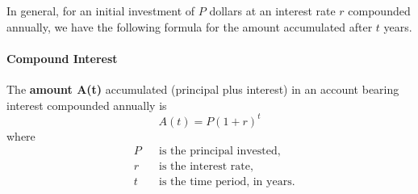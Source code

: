 \documentclass[10pt,]{book}
\newcommand{\terminology}[1]{\textbf{#1}}
\theoremstyle{plain}
\theoremstyle{definition}
\theoremstyle{definition}
\theoremstyle{definition}
\theoremstyle{definition}
\theoremstyle{definition}
\numberwithin{equation}{section}
\newcommand{\amp}{ & }
\begin{document}
    In general, for an initial investment of \(P\) dollars at an interest rate \(r\) compounded annually, we have the following formula for the amount accumulated after \(t\) years.
%
\typeout{************************************************}
\typeout{************************************************}
\paragraph[Compound Interest]{Compound Interest}\label{paragraphs-57}
\index{}
    The \terminology{amount A(t)} accumulated (principal plus interest) in an account bearing interest compounded annually is
    \begin{equation*}A(t) = P(1 + r)^t\end{equation*}
    where 
    \begin{align*}
    \amp P \amp\amp \text{is the principal invested,} \\
    \amp r \amp\amp \text{is the interest rate,} \\
    \amp t \amp\amp \text{is the time period, in years.}
    \end{align*}
%
\par
\end{document}
